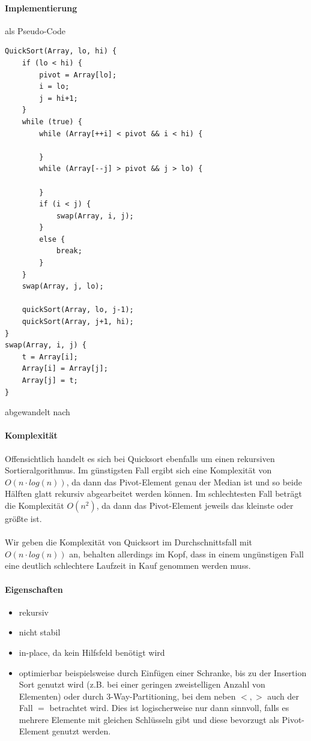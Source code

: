 \documentclass[11pt,a4paper]{scrartcl}
\begin{document}
\paragraph{Implementierung} als Pseudo-Code
\begin{lstlisting}
QuickSort(Array, lo, hi) {
	if (lo < hi) {
		pivot = Array[lo];
		i = lo;
		j = hi+1;	
	}
	while (true) {
		while (Array[++i] < pivot && i < hi) {
					
		}
		while (Array[--j] > pivot && j > lo) {
		
		}
		if (i < j) {
			swap(Array, i, j);		
		}	
		else {
			break;		
		}
	}
	swap(Array, j, lo);
	
	quickSort(Array, lo, j-1);
	quickSort(Array, j+1, hi);
}
swap(Array, i, j) {
	t = Array[i];
	Array[i] = Array[j];
	Array[j] = t;
}
\end{lstlisting} abgewandelt nach \parencite[][S. 29]{Taschenbuch}
\paragraph{Komplexität}
Offensichtlich handelt es sich bei Quicksort ebenfalls um einen rekursiven Sortieralgorithmus. Im günstigsten Fall ergibt sich eine Komplexität von $O(n \cdot log(n))$, da dann das Pivot-Element genau der Median ist und so beide Hälften glatt rekursiv abgearbeitet werden können. Im schlechtesten Fall beträgt die Komplexität $O(n^{2})$, da dann das Pivot-Element jeweils das kleinste oder größte ist. \\\\
Wir geben die Komplexität von Quicksort im Durchschnittsfall mit $O(n \cdot log(n))$ an, behalten allerdings im Kopf, dass in einem ungünstigen Fall eine deutlich schlechtere Laufzeit in Kauf genommen werden muss.
\paragraph{Eigenschaften}
\begin{itemize}
\item rekursiv
\item nicht stabil
\item in-place, da kein Hilfsfeld benötigt wird
\item optimierbar beispielsweise durch Einfügen einer Schranke, bis zu der Insertion Sort genutzt wird (z.B. bei einer geringen zweistelligen Anzahl von Elementen) oder durch 3-Way-Partitioning, bei dem neben $<, >$ auch der Fall $=$ betrachtet wird. Dies ist logischerweise nur dann sinnvoll, falls es mehrere Elemente mit gleichen Schlüsseln gibt und diese bevorzugt als Pivot-Element genutzt werden.
\end{itemize}
\end{document}
